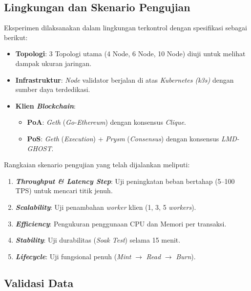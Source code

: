 \subsection{Lingkungan dan Skenario Pengujian}

Eksperimen dilaksanakan dalam lingkungan terkontrol dengan spesifikasi sebagai berikut:
\begin{itemize}
    \item \textbf{Topologi}: 3 Topologi utama (4 Node, 6 Node, 10 Node) diuji untuk melihat dampak ukuran jaringan.
    \item \textbf{Infrastruktur}: \textit{Node} validator berjalan di atas \textit{Kubernetes (k3s)} dengan sumber daya terdedikasi.
    \item \textbf{Klien \textit{Blockchain}}:
    \begin{itemize}
        \item \textbf{PoA}: \textit{Geth} (\textit{Go-Ethereum}) dengan konsensus \textit{Clique}.
        \item \textbf{PoS}: \textit{Geth} (\textit{Execution}) + \textit{Prysm} (\textit{Consensus}) dengan konsensus \textit{LMD-GHOST}.
    \end{itemize}
\end{itemize}

Rangkaian skenario pengujian yang telah dijalankan meliputi:
\begin{enumerate}
    \item \textbf{\textit{Throughput \& Latency Step}}: Uji peningkatan beban bertahap (5--100 TPS) untuk mencari titik jenuh.
    \item \textbf{\textit{Scalability}}: Uji penambahan \textit{worker} klien (1, 3, 5 \textit{workers}).
    \item \textbf{\textit{Efficiency}}: Pengukuran penggunaan CPU dan Memori per transaksi.
    \item \textbf{\textit{Stability}}: Uji durabilitas (\textit{Soak Test}) selama 15 menit.
    \item \textbf{\textit{Lifecycle}}: Uji fungsional penuh (\textit{Mint} $\rightarrow$ \textit{Read} $\rightarrow$ \textit{Burn}).
\end{enumerate}

\subsection{Validasi Data}


